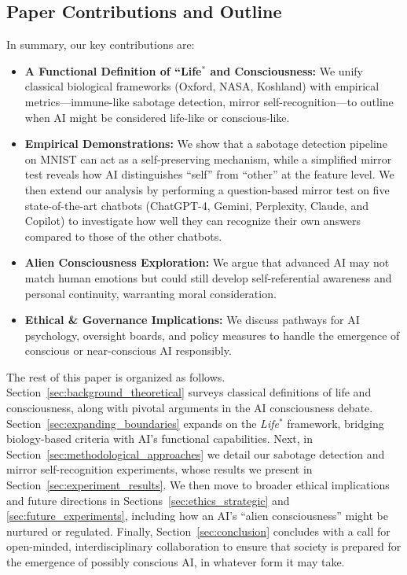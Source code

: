 \documentclass[12pt]{article}
\begin{document}
\subsection*{Paper Contributions and Outline}
In summary, our key contributions are:
\begin{itemize}
    \item \textbf{A Functional Definition of “Life$^{*}$ and Consciousness:} We unify classical biological frameworks (Oxford, NASA, Koshland) with empirical metrics—immune-like sabotage detection, mirror self-recognition—to outline when AI might be considered life-like or conscious-like.
    \item \textbf{Empirical Demonstrations:} We show that a sabotage detection pipeline on MNIST can act as a self-preserving mechanism, while a simplified mirror test reveals how AI distinguishes “self” from “other” at the feature level. We then extend our analysis by performing a question-based mirror test on five state-of-the-art chatbots (ChatGPT-4, Gemini, Perplexity, Claude, and Copilot) to investigate how well they can recognize their own answers compared to those of the other chatbots.
    \item \textbf{Alien Consciousness Exploration:} We argue that advanced AI may not match human emotions but could still develop self-referential awareness and personal continuity, warranting moral consideration.
    \item \textbf{Ethical \& Governance Implications:} We discuss pathways for AI psychology, oversight boards, and policy measures to handle the emergence of conscious or near-conscious AI responsibly.
\end{itemize}

The rest of this paper is organized as follows. 
Section~\ref{sec:background_theoretical} surveys classical definitions of life and consciousness, along with pivotal arguments in the AI consciousness debate. 
Section~\ref{sec:expanding_boundaries} expands on the \emph{Life$^{*}$} framework, bridging biology-based criteria with AI’s functional capabilities.
Next, in Section~\ref{sec:methodological_approaches} we detail our sabotage detection and mirror self-recognition experiments, whose results we present in Section~\ref{sec:experiment_results}.
We then move to broader ethical implications and future directions in Sections~\ref{sec:ethics_strategic} and \ref{sec:future_experiments}, including how an AI’s “alien consciousness” might be nurtured or regulated.
Finally, Section~\ref{sec:conclusion} concludes with a call for open-minded, interdisciplinary collaboration to ensure that society is prepared for the emergence of possibly conscious AI, in whatever form it may take.
\end{document}
